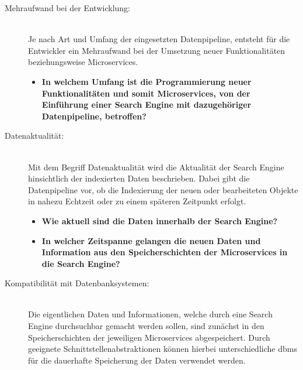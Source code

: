 \begin{description}
    \item[Mehraufwand bei der Entwicklung:]\hfill \\
    Je nach Art und Umfang der eingesetzten Datenpipeline, entsteht für die Entwickler ein Mehraufwand bei der Umsetzung neuer Funktionalitäten beziehungsweise Microservices.
    
    \begin{itemize}
        \item \textbf{In welchem Umfang ist die Programmierung neuer Funktionalitäten und somit Microservices, von der Einführung einer Search Engine mit dazugehöriger Datenpipeline, betroffen?}
    \end{itemize}

    \item[Datenaktualität:]\hfill \\
    Mit dem Begriff \glqq Datenaktualität\grqq{} wird die Aktualität der Search Engine hinsichtlich der indexierten Daten beschrieben. Dabei gibt die Datenpipeline vor, ob die Indexierung der neuen oder bearbeiteten Objekte in nahezu Echtzeit oder zu einem späteren Zeitpunkt erfolgt.

    \begin{itemize}
        \item \textbf{Wie aktuell sind die Daten innerhalb der Search Engine?}
        \item \textbf{In welcher Zeitspanne gelangen die neuen Daten und Information aus den Speicherschichten der Microservices in die Search Engine?}
    \end{itemize}
    
    
    
    \item[Kompatibilität mit Datenbanksystemen:]\hfill \\
    Die eigentlichen Daten und Informationen, welche durch eine Search Engine \glqq durchsuchbar\grqq{} gemacht werden sollen, sind zunächst in den Speicherschichten der jeweiligen Microservices abgespeichert. Durch geeignete Schnittstellenabstraktionen können hierbei unterschiedliche \gls{dbms} für die dauerhafte Speicherung der Daten verwendet werden.


\end{description}
